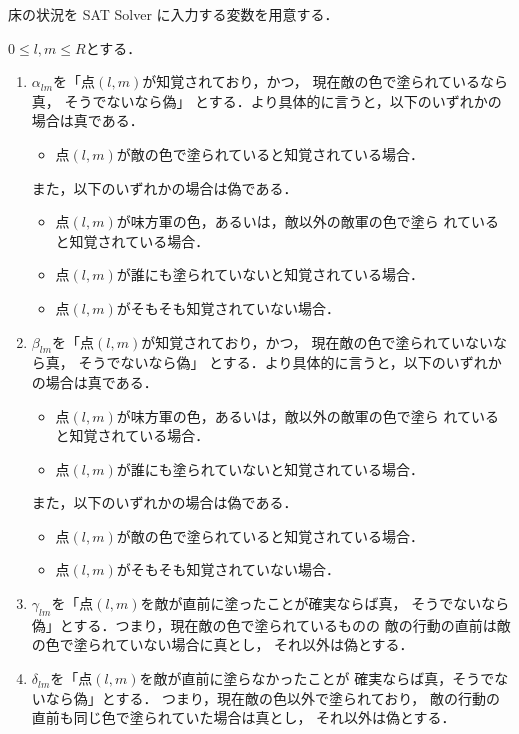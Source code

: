 床の状況を SAT Solver に入力する変数を用意する．

\begin{nota}[塗りのための床からの制約変数] \label{nota:field_var}
 $0 \leq l, m \leq R$とする．
 \begin{enumerate}[1.]
  \item $\alpha_{lm}$を「点$(l, m)$が知覚されており，かつ，
        現在敵の色で塗られているなら真，
        そうでないなら偽」
        とする．より具体的に言うと，以下のいずれかの場合は真である．
        \begin{itemize}
         \item 点$(l, m)$が敵の色で塗られていると知覚されている場合．
        \end{itemize}
        また，以下のいずれかの場合は偽である．
        \begin{itemize}
         \item 点$(l, m)$が味方軍の色，あるいは，敵以外の敵軍の色で塗ら
               れていると知覚されている場合．
         \item 点$(l, m)$が誰にも塗られていないと知覚されている場合．
         \item 点$(l, m)$がそもそも知覚されていない場合．
        \end{itemize}
  \item $\beta_{lm}$を「点$(l, m)$が知覚されており，かつ，
        現在敵の色で塗られていないなら真，
        そうでないなら偽」
        とする．より具体的に言うと，以下のいずれかの場合は真である．
        \begin{itemize}
         \item 点$(l, m)$が味方軍の色，あるいは，敵以外の敵軍の色で塗ら
               れていると知覚されている場合．
         \item 点$(l, m)$が誰にも塗られていないと知覚されている場合．
        \end{itemize}
        また，以下のいずれかの場合は偽である．
        \begin{itemize}
         \item 点$(l, m)$が敵の色で塗られていると知覚されている場合．
         \item 点$(l, m)$がそもそも知覚されていない場合．
        \end{itemize}
  \item $\gamma_{lm}$を「点$(l, m)$を敵が直前に塗ったことが確実ならば真，
        そうでないなら偽」とする．つまり，現在敵の色で塗られているものの
        敵の行動の直前は敵の色で塗られていない場合に真とし，
        それ以外は偽とする．
  \item $\delta_{lm}$を「点$(l, m)$を敵が直前に塗らなかったことが
        確実ならば真，そうでないなら偽」とする．
        つまり，現在敵の色以外で塗られており，
        敵の行動の直前も同じ色で塗られていた場合は真とし，
        それ以外は偽とする．
 \end{enumerate}
\end{nota}

